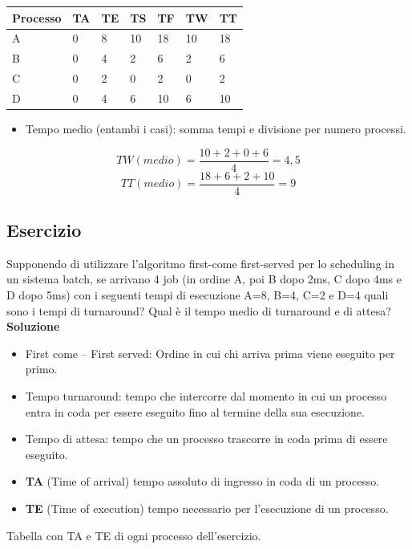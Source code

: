 \documentclass{article}
\begin{document}
\vskip 0.3cm
\begin{tabular}{|p{}|p{}|p{}|p{}|p{}|p{}|p{}|}
\hline
Processo        & TA              & TE      & TS      & TF     & TW      & TT       \\
\hline
A            & 0             & 8      &10      &18       & 10    &18  \\
B            & 0             & 4      &2      &6        & 2    &6  \\
C            & 0             & 2      &0      &2        & 0    &2  \\
D            & 0             & 4      &6      &10       & 6    &10 \\
\hline
\end{tabular}

\begin{itemize}
\item Tempo medio (entambi i casi): somma tempi e divisione per numero
processi.
\end{itemize}

\[TW(medio) = \frac{10+2+0+6}{4} = 4,5 \]
\[TT(medio) = \frac{18+6+2+10}{4} = 9 \]





\subsection{Esercizio}
Supponendo di utilizzare l’algoritmo first-come first-served per lo scheduling in un
sistema batch, se arrivano 4 job (in ordine A, poi B dopo 2ms, C dopo 4ms e D dopo 5ms)
con i seguenti tempi di esecuzione A=8, B=4, C=2 e D=4 quali sono i tempi di turnaround?
Qual è il tempo medio di turnaround e di attesa?
\vskip 0.5cm
\textbf{Soluzione}\\
\begin{itemize}
\item  First come – First served: Ordine in cui chi arriva prima viene eseguito per primo.
\item  Tempo turnaround: tempo che intercorre dal momento in cui un processo entra in coda per essere eseguito fino al termine della sua esecuzione.
\item Tempo di attesa: tempo che un processo trascorre in coda prima di essere eseguito.
\item  \textbf{TA}  (Time of arrival)  tempo assoluto di ingresso in coda di un processo.
\item  \textbf{TE}  (Time of execution) tempo necessario per l’esecuzione di un processo.
\end{itemize}
Tabella con TA e TE di ogni processo dell’esercizio.
\end{document}

